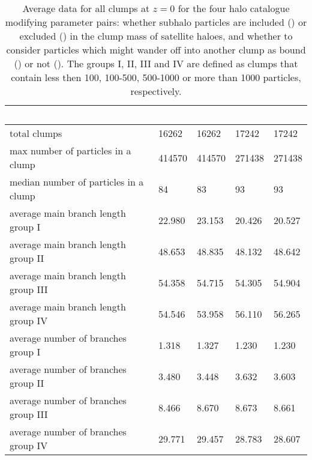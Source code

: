 \begin{table}[!ht]
	\begin{center}

		{\small 
			\begin{tabular}[c]{l | p{1.8cm} | p{1.8cm} | p{1.8cm} | p{1.8cm} |}
											&	\inc\ \sad & \exc\ \sad\ & \inc\ \nosad\ & \exc\ \nosad\ \\ 
				
				\hline
				total clumps	 						&	16262	& 	16262	& 	17242	&	17242 	\\
				
				max number of particles in a clump 		&	414570	& 	414570	& 	271438	&	271438 	\\
				
				median number of particles in a clump 	&	84		& 	83		& 	93		&	93 		\\
				
				\hline
				average main branch length group I		&	22.980	& 	23.153	& 	20.426	&	20.527 	\\
				
				average main branch length group II		&	48.653	& 	48.835	& 	48.132	&	48.642 	\\
				
				average main branch length group III	&	54.358	& 	54.715	& 	54.305	&	54.904 	\\
				
				average main branch length group IV		&	54.546	& 	53.958	& 	56.110	&	56.265 	\\
				
				\hline
				average number of branches group I		&	1.318	& 	1.327	& 	1.230	&	1.230 	\\
				
				average number of branches group II		&	3.480	& 	3.448	& 	3.632	&	3.603 	\\
				
				average number of branches group III	&	8.466	& 	8.670	& 	8.673	&	8.661 	\\
				
				average number of branches group IV		&	29.771	& 	29.457	& 	28.783	&	28.607 	\\	
				
				\hline	
			\end{tabular}
		}
		\caption{
			Average data for all clumps at $z=0$ for the four halo catalogue modifying parameter pairs: whether subhalo particles are included (\inc) or excluded (\exc) in the clump mass of satellite haloes, and whether to consider particles which might wander off into another clump as bound (\nosad) or not (\sad).
			The groups I, II, III and IV are defined as clumps that contain less then 100, 100-500, 500-1000 or more than 1000 particles, respectively.
		}
		\label{tab:saddle_nosaddle}
	\end{center}	
\end{table}